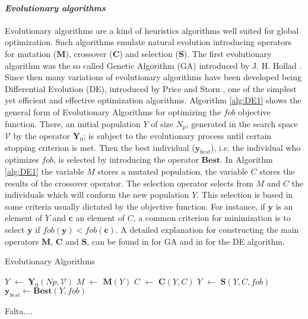 \paragraph{\it Evolutionary algorithms}
Evolutionary algorithms are a kind of heuristics algorithms well 
suited for global optimization. Such algorithms emulate natural
evolution introducing operators for mutation ($\mathbf{M}$), crossover 
($\mathbf{C}$) and selection ($\mathbf{S}$). The first evolutionary 
algorithm was the so called Genetic Algorithm (GA) introduced by J. H. Hollad 
\cite{JHH1975}. Since then many variations of evolutionary algorithms 
have been developed being Differential Evolution (DE), introduced by Price 
and Storn \cite{Storn1997}, one of the simplest yet efficient and 
effective optimization algorithms. Algorithm \ref{alg:DE1} shows the 
general form of Evolutionary Algorithms for optimizing the $fob$ 
objective function. There, an initial population $Y$ of size $N_p$, 
generated in the search space $\mathcal{V}$ by the operator $\mathbf{Y}_0$;
is subject to the evolutionary process until certain stopping criterion is 
met. Then the best individual ($\mathbf{y}_{best}$), i.e. the individual who
optimizes $fob$, is selected by introducing the operator $\mathbf{Best}$. 
In Algorithm \ref{alg:DE1} the variable $M$ stores a mutated population, 
the variable $C$ stores the results of the crossover operator. The selection
operator selects from $M$ and $C$ the individuals which will conform the new
population $Y$. This selection is based in some criteria usually dictated by the
objective function. For instance, if $\mathbf{y}$ is an element of $Y$
and $\mathbf{c}$ an element of $C$, a common criterion for minimization is 
to select $\mathbf{y}$ if $fob(\mathbf{y})<fob(\mathbf{c})$.
A detailed explanation for constructing the main operators 
$\mathbf{M}$, $\mathbf{C}$ and $\mathbf{S}$, can be found in
\cite{Bagchi1999} for GA and in \cite{Price_Storn2005} for the DE
algorithm.
%
\begin{algorithm}[H]
\caption{Evolutionary Algorithms}
\label{alg:DE1}
\begin{algorithmic}
\State $Y$ $\leftarrow$ $\mathbf{Y}_0(Np,\mathcal{V})$
\State $M$ $\leftarrow$  $\mathbf{M}(Y)$
\State $C$ $\leftarrow$  $\mathbf{C}(Y,C)$
\State $Y$ $\leftarrow$  $\mathbf{S}(Y,C,fob)$ 
\EndWhile
\State $\mathbf{y}_{best} \leftarrow \mathbf{Best}(Y, fob)$
\end{algorithmic}
\end{algorithm}%


Falta....